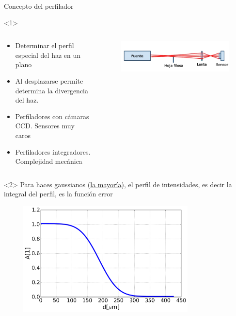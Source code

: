 \begin{frame}[fragile]{Concepto del perfilador}
\begin{onlyenv}<1>
    \begin{columns}
        \begin{column}{0.5\textwidth}
        
            \begin{itemize}
                \item Determinar el perfil especial del haz en un plano
                \item Al desplazarse permite determina la divergencia del haz.
                \item Perfiladores con cámaras CCD. Sensores muy caros
                \item Perfiladores integradores. Complejidad mecánica
            \end{itemize}
        \end{column}
        
        \begin{column}{0.5\textwidth}
            \begin{figure}[H]
            \centering
            \includegraphics[width=\textwidth]{fig/perfilador/esquema_basico}
            \label{fig:perfilador/esquema_basico}
            \end{figure}
        \end{column}
    \end{columns}
\end{onlyenv}

\begin{onlyenv}<2>
\centering
Para haces gaussianos (\underline{la mayoría}), el perfil de intensidades, es decir la integral del perfil, es la función error

\begin{figure}
\centering
\includegraphics[width=0.8\textwidth]{fig/perfilador/err_function.png}
\label{fig:perfilador/err_function}
\end{figure}

\end{onlyenv}

\end{frame}

